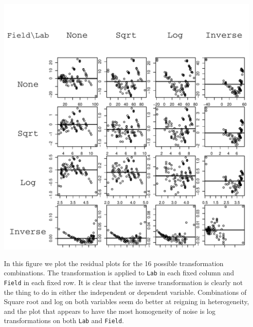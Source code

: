 \documentclass{homework}
\begin{document}
\begin{longproblem}
\vspace{-2em}
\begin{minipage}{.5\textwidth}
\includegraphics[width=\textwidth]{resid_matrix.pdf}
\end{minipage}
\begin{minipage}{.5\textwidth}
In this figure we plot the residual plots for the 16 possible transformation
combinations. The transformation is applied to \texttt{Lab} in each fixed
column and \texttt{Field} in each fixed row.  It is clear that the inverse
transformation is clearly not the thing to do in either the independent or
dependent variable.  Combinations of Square root and log on both variables seem 
do better at reigning in heterogeneity, 
and the plot that appears to have the most homogeneity of
noise is log transformations on both \texttt{Lab} and \texttt{Field}.
\end{minipage}
\end{longproblem}
\end{document}
